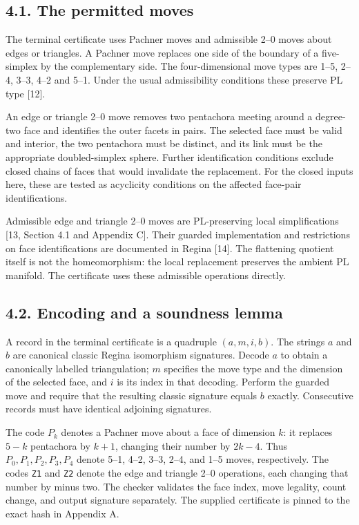 \documentclass[11pt,letterpaper]{article}
\begin{document}
\subsection*{4.1. The permitted moves}
The terminal certificate uses Pachner moves and admissible 2--0 moves about edges or triangles. A Pachner move replaces one side of the boundary of a five-simplex by the complementary side. The four-dimensional move types are 1--5, 2--4, 3--3, 4--2 and 5--1. Under the usual admissibility conditions these preserve PL type [12].

An edge or triangle 2--0 move removes two pentachora meeting around a degree-two face and identifies the outer facets in pairs. The selected face must be valid and interior, the two pentachora must be distinct, and its link must be the appropriate doubled-simplex sphere. Further identification conditions exclude closed chains of faces that would invalidate the replacement. For the closed inputs here, these are tested as acyclicity conditions on the affected face-pair identifications.

Admissible edge and triangle 2--0 moves are PL-preserving local simplifications [13, Section 4.1 and Appendix C]. Their guarded implementation and restrictions on face identifications are documented in Regina [14]. The flattening quotient itself is not the homeomorphism: the local replacement preserves the ambient PL manifold. The certificate uses these admissible operations directly.

\subsection*{4.2. Encoding and a soundness lemma}
A record in the terminal certificate is a quadruple $(a,m,i,b)$. The strings $a$ and $b$ are canonical classic Regina isomorphism signatures. Decode $a$ to obtain a canonically labelled triangulation; $m$ specifies the move type and the dimension of the selected face, and $i$ is its index in that decoding. Perform the guarded move and require that the resulting classic signature equals $b$ exactly. Consecutive records must have identical adjoining signatures.

The code $P_k$ denotes a Pachner move about a face of dimension $k$: it replaces $5-k$ pentachora by $k+1$, changing their number by $2k-4$. Thus $P_0,P_1,P_2,P_3,P_4$ denote 5--1, 4--2, 3--3, 2--4, and 1--5 moves, respectively. The codes {\small\texttt{Z1}} and {\small\texttt{Z2}} denote the edge and triangle 2--0 operations, each changing that number by minus two. The checker validates the face index, move legality, count change, and output signature separately. The supplied certificate is pinned to the exact hash in Appendix A.
\end{document}

